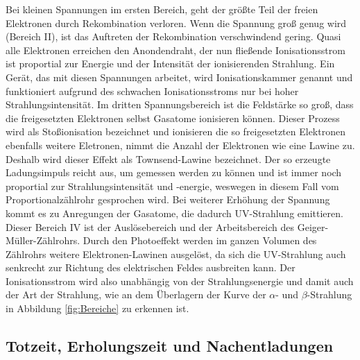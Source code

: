 Bei kleinen Spannungen im ersten Bereich, geht der größte Teil der freien Elektronen durch Rekombination verloren.
Wenn die Spannung groß genug wird (Bereich \RN{2}), ist das Auftreten der Rekombination verschwindend gering.
Quasi alle Elektronen erreichen den Anondendraht, der nun fließende Ionisationsstrom ist proportial zur Energie und der Intensität der ionisierenden Strahlung.
Ein Gerät, das mit diesen Spannungen arbeitet, wird Ionisationskammer genannt und funktioniert aufgrund des schwachen Ionisationsstroms nur bei hoher Strahlungsintensität.
Im dritten Spannungsbereich ist die Feldstärke so groß, dass die freigesetzten Elektronen selbst Gasatome ionisieren können.
Dieser Prozess wird als Stoßionisation bezeichnet und ionisieren die so freigesetzten Elektronen ebenfalls weitere Eletronen, nimmt die Anzahl der Elektronen wie eine Lawine zu.
Deshalb wird dieser Effekt als Townsend-Lawine bezeichnet.
Der so erzeugte Ladungsimpuls reicht aus, um gemessen werden zu können und ist immer noch proportial zur Strahlungsintensität und -energie, weswegen in diesem Fall vom Proportionalzählrohr gesprochen wird.
Bei weiterer Erhöhung der Spannung kommt es zu Anregungen der Gasatome, die dadurch UV-Strahlung emittieren.
Dieser Bereich \RN{4} ist der Auslösebereich und der Arbeitsbereich des Geiger-Müller-Zählrohrs.
Durch den Photoeffekt werden im ganzen Volumen des Zählrohrs weitere Elektronen-Lawinen ausgelöst, da sich die UV-Strahlung auch senkrecht zur Richtung des elektrischen Feldes ausbreiten kann.
Der Ionisationsstrom wird also unabhängig von der Strahlungsenergie und damit auch der Art der Strahlung, wie an dem Überlagern der Kurve der $\alpha$- und $\beta$-Strahlung in Abbildung \ref{fig:Bereiche} zu erkennen ist. \cite{V703}

\subsection{Totzeit, Erholungszeit und Nachentladungen}

